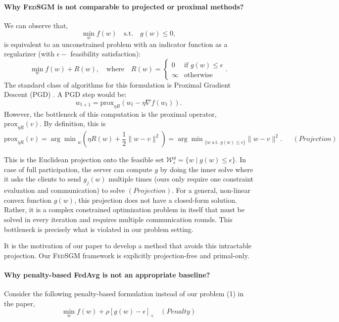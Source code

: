 \documentclass{article} %
\begin{document}
\paragraph{Why \textsc{FedSGM} is not comparable to projected or proximal methods?}
We can observe that, $$\min_w f(w) \quad \text{s.t.} \quad g(w) \le 0,$$
is equivalent to an unconstrained problem with an indicator function as a regularizer (with $\epsilon-$ feasibility satisfaction):
$$\min_w f(w) + R(w), \quad \text{where} \quad R(w) = \begin{cases} 0 & \text{if } g(w) \le \epsilon \\ \infty & \text{otherwise} \end{cases}.$$
The standard class of algorithms for this formulation is Proximal Gradient Descent (PGD) \citep{condat2022murana}. A PGD step would be:
$$w_{t+1} = \text{prox}_{\eta R}(w_t - \eta \nabla f(w_t)).$$
However, the bottleneck of this computation is the proximal operator, $\text{prox}_{\eta R}(v)$. By definition, this is
$$\text{prox}_{\eta R}(v) = {\displaystyle\arg\min}_{w} (\eta R(w) + \frac{1}{2} \|w - v\|^2) = {\displaystyle\arg\min}_{\{w \text{ s.t. } g(w) \le \epsilon\}} \|w - v\|^2.\   \ \ \ \ \ \ (Projection)$$

This is the Euclidean projection onto the feasible set $\boldsymbol{\mathcal{W}}^g_{\epsilon} = \{w \mid g(w) \le \epsilon\}$. In case of full participation, the server can compute $g$ by doing the inner solve where it asks the clients to send $g_j(w)$ multiple times (ours only require one constraint evaluation and communication) to solve $(Projection)$. For a general, non-linear convex function $g(w)$, this projection does not have a closed-form solution. Rather, it is a complex constrained optimization problem in itself that must be solved in every iteration and requires multiple communication rounds. This bottleneck is precisely what is violated in our problem setting.

It is the motivation of our paper to develop a method that avoids this intractable projection. Our \textsc{FedSGM} framework is explicitly projection-free and primal-only.

\paragraph{Why penalty-based FedAvg is not an appropriate baseline?}

Consider the following penalty-based formulation instead of our problem (1) in the paper,
$$\min_{w} f(w)+\rho[g(w) - \epsilon]_+ \ \ \ \ (Penalty)$$
\end{document}
